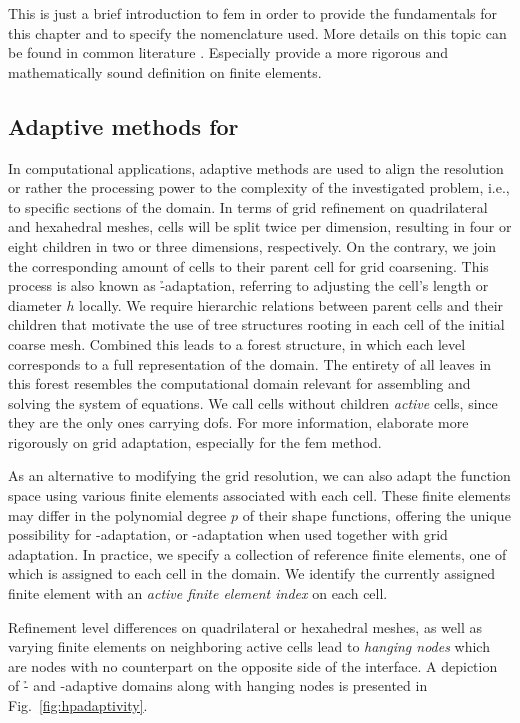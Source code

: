 This is just a brief introduction to \gls{fem} in order to provide the fundamentals for this chapter and to specify the nomenclature used. More details on this topic can be found in common literature \parencite[e.g.,][]{quarteroni1994, ern2004, elman2014}. Especially \textcite{brenner2008} provide a more rigorous and mathematically sound definition on finite elements.


\subsection{Adaptive methods for }

In computational applications, adaptive methods are used to align the resolution or rather the processing power to the complexity of the investigated problem, i.e., to specific sections of the domain. In terms of grid refinement on quadrilateral and hexahedral meshes, cells will be split twice per dimension, resulting in four or eight children in two or three dimensions, respectively. On the contrary, we join the corresponding amount of cells to their parent cell for grid coarsening. This process is also known as \h-adaptation, referring to adjusting the cell's length or diameter \(h\) locally. We require hierarchic relations between parent cells and their children that motivate the use of tree structures rooting in each cell of the initial coarse mesh. Combined this leads to a forest structure, in which each level corresponds to a full representation of the domain. The entirety of all leaves in this forest resembles the computational domain relevant for assembling and solving the system of equations. We call cells without children \textit{active} cells, since they are the only ones carrying \glspl{dof}. For more information, \textcite{bangerth2003} elaborate more rigorously on grid adaptation, especially for the \gls{fem} method.

As an alternative to modifying the grid resolution, we can also adapt the function space using various finite elements associated with each cell. These finite elements may differ in the polynomial degree $p$ of their shape functions, offering the unique possibility for \p-adaptation, or \hp-adaptation when used together with grid adaptation. In practice, we specify a collection of reference finite elements, one of which is assigned to each cell in the domain. We identify the currently assigned finite element with an \textit{active finite element index} on each cell.

Refinement level differences on quadrilateral or hexahedral meshes, as well as varying finite elements on neighboring active cells lead to \textit{hanging nodes} which are nodes with no counterpart on the opposite side of the interface. A depiction of \h- and \p-adaptive domains along with hanging nodes is presented in Fig.~\ref{fig:hpadaptivity}.

